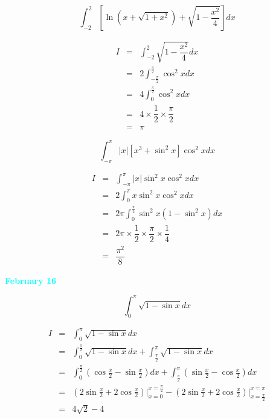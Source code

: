\begin{example}[][Exam: 28.3.1]
	$$\int_{-2}^{2}\left[\ln(x+\sqrt{1+x^{2}})+\sqrt{1-\dfrac{x^{2}}{4}}\right]dx$$
\end{example}
\begin{solution}
	\begin{eqnarray*}
		I & = & \int_{-2}^{2}\sqrt{1-\dfrac{x^{2}}{4}}dx\\
		  & = & 2\int_{-\frac{\pi}{2}}^{\frac{\pi}{2}}\cos^{2}xdx\\
		  & = & 4\int_{0}^{\frac{\pi}{2}}\cos^{2}xdx\\
		  & = & 4\times \dfrac{1}{2}\times \dfrac{\pi}{2}\\
		  & = & \pi 
	\end{eqnarray*}
\end{solution}

\begin{example}[][Exam: 28.3.2]
	$$\int_{-\pi}^{\pi}|x|[x^{3}+\sin^{2}x]\cos^{2}xdx$$
\end{example}
\begin{solution}
	\begin{eqnarray*}
		I & = & \int_{-\pi}^{\pi} |x|\sin^{2}x \cos^{2}xdx\\
		  & = & 2\int_{0}^{\pi}x\sin^{2}x\cos^{2}xdx\\
		  & = & 2\pi\int_{0}^{\frac{\pi}{2}}\sin^{2}x(1-\sin^{2}x)dx\\
		  & = & 2\pi\times \dfrac{1}{2}\times \dfrac{\pi}{2}\times \dfrac{1}{4}\\
		  & = & \dfrac{\pi^{2}}{8}
	\end{eqnarray*}
\end{solution}

\textcolor{cyan}{\textbf{February 16}}

\begin{example}[][Exam: 28.3.3]
	$$\int_{0}^{\pi}\sqrt{1-\sin x}dx$$
\end{example}
\begin{solution}
	\begin{eqnarray*}
		I & = & \int_{0}^{\pi}\sqrt{1-\sin x}dx\\
		  & = & \int_{0}^{\frac{\pi}{2}}\sqrt{1-\sin x}dx + \int_{\frac{\pi}{2}}^{\pi}\sqrt{1-\sin x}dx\\
		  & = & \int_{0}^{\frac{\pi}{2}}(\cos \frac{x}{2}-\sin \frac{x}{2})dx + \int_{\frac{\pi}{2}}^{\pi}(\sin \frac{x}{2}-\cos \frac{x}{2})dx\\
		  & = & (2\sin \frac{x}{2}+2\cos \frac{x}{2})\big|_{x=0}^{x=\frac{\pi}{2}} - (2\sin \frac{x}{2}+2\cos \frac{x}{2})\big|_{x=\frac{\pi}{2}}^{x=\pi}\\
		  & = & 4\sqrt{2}-4
	\end{eqnarray*}
\end{solution}

